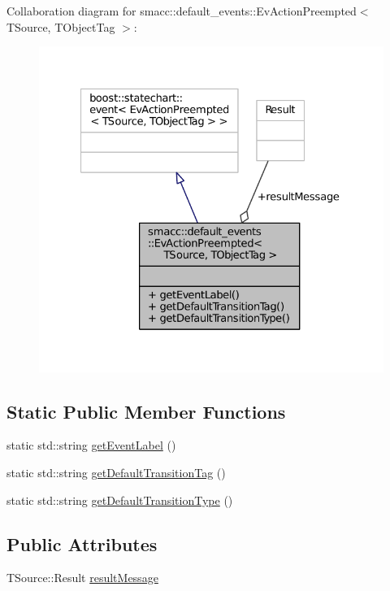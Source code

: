Collaboration diagram for smacc\+:\+:default\+\_\+events\+:\+:Ev\+Action\+Preempted$<$ T\+Source, T\+Object\+Tag $>$\+:
\nopagebreak
\begin{figure}[H]
\begin{center}
\leavevmode
\includegraphics[width=327pt]{structsmacc_1_1default__events_1_1EvActionPreempted__coll__graph}
\end{center}
\end{figure}
\subsection*{Static Public Member Functions}
\begin{DoxyCompactItemize}
\item 
static std\+::string \hyperlink{structsmacc_1_1default__events_1_1EvActionPreempted_ae872ff61b26c07446358f41be00c8f59}{get\+Event\+Label} ()
\item 
static std\+::string \hyperlink{structsmacc_1_1default__events_1_1EvActionPreempted_a71e953e6cd08d825c85ffca7819a0145}{get\+Default\+Transition\+Tag} ()
\item 
static std\+::string \hyperlink{structsmacc_1_1default__events_1_1EvActionPreempted_a29edbbf19a68ab8930f2f3664c45c9e7}{get\+Default\+Transition\+Type} ()
\end{DoxyCompactItemize}
\subsection*{Public Attributes}
\begin{DoxyCompactItemize}
\item 
T\+Source\+::\+Result \hyperlink{structsmacc_1_1default__events_1_1EvActionPreempted_a38f3c09c9c672b82b08ea5ff2085280e}{result\+Message}
\end{DoxyCompactItemize}


